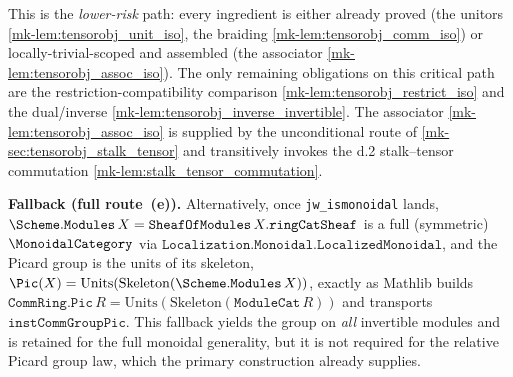 \begin{lemma}
  This is the \emph{lower-risk} path: every ingredient is either already proved
  (the unitors \ref{mk-lem:tensorobj_unit_iso}, the braiding
  \ref{mk-lem:tensorobj_comm_iso}) or locally-trivial-scoped and assembled (the
  associator \ref{mk-lem:tensorobj_assoc_iso}). The only remaining obligations on this
  critical path are the restriction-compatibility comparison
  \ref{mk-lem:tensorobj_restrict_iso} and the
  dual/inverse \ref{mk-lem:tensorobj_inverse_invertible}. The associator
  \ref{mk-lem:tensorobj_assoc_iso} is supplied by the unconditional route of
  \ref{mk-sec:tensorobj_stalk_tensor} and transitively invokes the d.2 stalk--tensor
  commutation \ref{mk-lem:stalk_tensor_commutation}.

  \textbf{Fallback (full route~(e)).} Alternatively, once
  \texttt{jw\_ismonoidal} lands, \(\Scheme.\mathtt{Modules}\,X =
  \mathtt{SheafOfModules}\,X.\mathtt{ringCatSheaf}\) is a full (symmetric)
  \(\MonoidalCategory\) via \(\mathtt{Localization.Monoidal.LocalizedMonoidal}\),
  and the Picard group is the units of its skeleton,
  \(\Pic(X) = \mathrm{Units}(\mathrm{Skeleton}(\Scheme.\mathtt{Modules}\,X))\),
  exactly as Mathlib builds \(\mathtt{CommRing.Pic}\,R =
  \mathrm{Units}(\mathrm{Skeleton}(\mathtt{ModuleCat}\,R))\) and transports
  \(\mathtt{instCommGroupPic}\). This fallback yields the group on \emph{all}
  invertible modules and is retained for the full monoidal generality, but it is
  not required for the relative Picard group law, which the primary construction
  already supplies.
\end{lemma}

